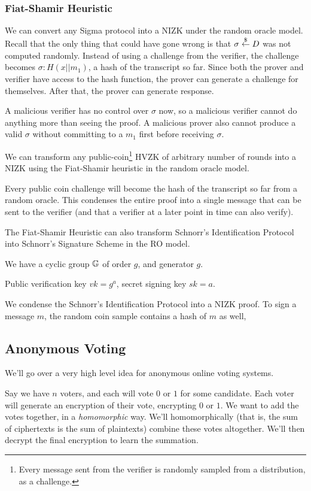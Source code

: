 \subsubsection{Fiat-Shamir Heuristic}
We can convert any Sigma protocol into a NIZK under the random oracle model. Recall that the only thing that could have gone wrong is that $\sigma\overset{\$}{\leftarrow} D$ was not computed randomly. Instead of using a challenge from the verifier, the challenge becomes $\sigma: H(x||m_1)$, a hash of the transcript so far. Since both the prover and verifier have access to the hash function, the prover can generate a challenge for themselves. After that, the prover can generate response.

A malicious verifier has no control over $\sigma$ now, so a malicious verifier cannot do anything more than seeing the proof. A malicious prover also cannot produce a valid $\sigma$ without committing to a $m_1$ first before receiving $\sigma$.

We can transform any public-coin\footnote{Every message sent from the verifier is randomly sampled from a distribution, as a challenge.} HVZK of arbitrary number of rounds into a NIZK using the Fiat-Shamir heuristic in the random oracle model.

Every public coin challenge will become the hash of the transcript so far from a random oracle. This condenses the entire proof into a single message that can be sent to the verifier (and that a verifier at a later point in time can also verify).

\begin{example}
    The Fiat-Shamir Heuristic can also transform Schnorr's Identification Protocol into Schnorr's Signature Scheme in the RO model.

    We have a cyclic group $\mathbb G$ of order $g$, and generator $g$.

    Public verification key $vk = g^a$, secret signing key $sk = a$.

    We condense the Schnorr's Identification Protocol into a NIZK proof. To sign a message $m$, the random coin sample contains a hash of $m$ as well, 
\end{example}

\subsection{Anonymous Voting}
We'll go over a very high level idea for anonymous online voting systems.

Say we have $n$ voters, and each will vote $0$ or $1$ for some candidate. Each voter will generate an encryption of their vote, encrypting $0$ or $1$. We want to add the votes together, in a \emph{homomorphic} way. We'll homomorphically (that is, the sum of ciphertexts is the sum of plaintexts) combine these votes altogether. We'll then decrypt the final encryption to learn the summation.

